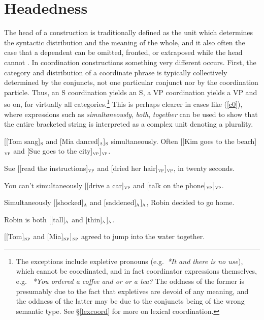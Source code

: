 \documentclass[output=paper]{langsci/langscibook}
\newcommand{\subl}[1]{$_{\small \textsc{#1}}$}
\begin{document}
\section{Headedness}

The head of a construction is traditionally defined as the unit which determines the syntactic distribution and the meaning of the whole, and it also often the case that a dependent can be omitted, fronted, or extraposed while the head cannot \citep{Zwicky85a}.
In coordination constructions something very different occurs. First, the category and distribution of
a coordinate phrase is typically collectively
determined by the conjuncts, not one particular conjunct
nor by the coordination particle.
Thus, an S coordination yields an S, a VP coordination yields a VP and so on, for virtually all categories.\footnote{The exceptions include
expletive pronouns (e.g.\ \emph{*It and there is no use}), which cannot be coordinated, and in fact coordinator expressions themselves, e.g. \ \emph{*You ordered a coffee and or or a tea?} The oddness of the former is presumably due to the fact that expletives are devoid of any meaning, and the oddness of the latter may be due to the conjuncts being of the wrong semantic type. See \S\ref{lexcoord} for more on lexical coordination.}
This is perhaps clearer in cases like (\ref{c0}), where
expressions such as \emph{simultaneously}, \emph{both}, 
\emph{together} can be used to show that the entire bracketed string
is interpreted as a complex unit denoting a plurality.


\begin{exe}
\ex
\begin{xlista}
\ex{} [[Tom sang]\subl{s} and [Mia danced]\subl{s}]\subl{s} simultaneously.
\ex{} Often [[Kim goes to the beach]\subl{vp} and [Sue goes to the city]\subl{vp}]\subl{vp}.

\ex{} Sue [[read the instructions]\subl{vp} and [dried her hair]\subl{vp}]\subl{vp}, in twenty seconds.

\ex{} You can't simultaneously [[drive a car]\subl{vp} and [talk on the phone]\subl{vp}]\subl{vp}.

\ex{} Simultaneously [[shocked]\subl{a} and [saddened]\subl{a}]\subl{a}, Robin decided to go home.

\ex Robin is both [[tall]\subl{a} and [thin]\subl{a}]\subl{a}.

\ex{} [[Tom]\subl{np} and [Mia]\subl{np}]\subl{np} agreed to jump into the water together.

\end{xlista}\label{c0}
\end{exe}
\end{document}
